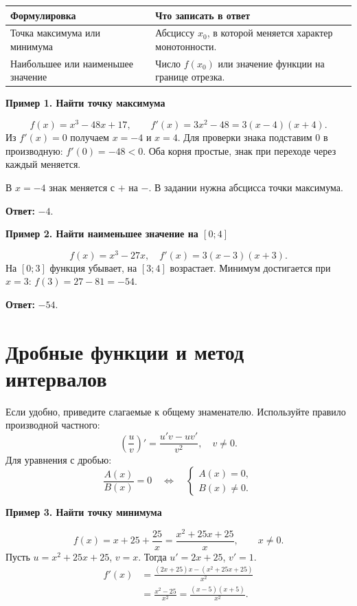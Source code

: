 \documentclass[a4paper,12pt]{article}
\newcommand{\topic}[1]{\section{\textcolor{darkaccent}{#1}}}
\newcommand{\ex}[1]{\par\medskip\textbf{#1}\par\smallskip}
\newcommand{\ans}[1]{\par\textbf{Ответ:} $#1$.}
\begin{document}
\begin{center}
\begin{tabularx}{\linewidth}{@{}p{.43\linewidth}X@{}}
\toprule Формулировка & Что записать в ответ\\ \midrule
Точка максимума или минимума & Абсциссу $x_0$, в которой меняется характер монотонности.\\
Наибольшее или наименьшее значение & Число $f(x_0)$ или значение функции на границе отрезка.\\ \bottomrule
\end{tabularx}
\end{center}
\ex{Пример 1. Найти точку максимума}
\[f(x)=x^3-48x+17,\qquad f'(x)=3x^2-48=3(x-4)(x+4).\]
Из $f'(x)=0$ получаем $x=-4$ и $x=4$. Для проверки знака подставим $0$ в производную: $f'(0)=-48<0$. Оба корня простые, знак при переходе через каждый меняется.
\begin{center}
\end{center}
В $x=-4$ знак меняется с $+$ на $-$. В задании нужна абсцисса точки максимума.
\ans{-4}
\ex{Пример 2. Найти наименьшее значение на $[0;4]$}
\[f(x)=x^3-27x,\quad f'(x)=3(x-3)(x+3).\]
На $[0;3]$ функция убывает, на $[3;4]$ возрастает. Минимум достигается при $x=3$: $f(3)=27-81=-54$.
\ans{-54}
\clearpage
\topic{Дробные функции и метод интервалов}
Если удобно, приведите слагаемые к общему знаменателю. Используйте правило производной частного:
\[\left(\frac{u}{v}\right)'=\frac{u'v-uv'}{v^2},\quad v\ne0.\]
Для уравнения с дробью:
\[\frac{A(x)}{B(x)}=0\quad\Longleftrightarrow\quad
\begin{cases}A(x)=0,\\ B(x)\ne0.\end{cases}\]
\ex{Пример 3. Найти точку минимума}
\[f(x)=x+25+\frac{25}{x}=\frac{x^2+25x+25}{x},\qquad x\ne0.\]
Пусть $u=x^2+25x+25$, $v=x$. Тогда $u'=2x+25$, $v'=1$.
\begin{align*}
f'(x)&=\frac{(2x+25)x-(x^2+25x+25)}{x^2}\\
&=\frac{x^2-25}{x^2}=\frac{(x-5)(x+5)}{x^2}.
\end{align*}
\end{document}

